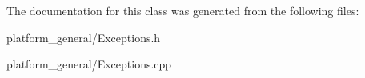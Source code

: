 \-The documentation for this class was generated from the following files\-:\begin{DoxyCompactItemize}
\item 
platform\-\_\-general/\-Exceptions.\-h\item 
platform\-\_\-general/\-Exceptions.\-cpp\end{DoxyCompactItemize}
